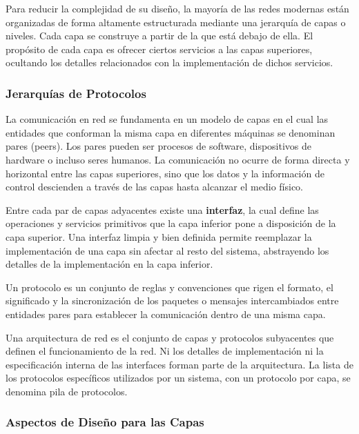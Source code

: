 Para reducir la complejidad de su diseño, la mayoría de las redes modernas están organizadas de forma altamente estructurada mediante una jerarquía de capas o niveles. Cada capa se construye a partir de la que está debajo de ella. El propósito de cada capa es ofrecer ciertos servicios a las capas superiores, ocultando los detalles relacionados con la implementación de dichos servicios.

\subsubsection{Jerarquías de Protocolos}

La comunicación en red se fundamenta en un modelo de capas en el cual las entidades que conforman la misma capa en diferentes máquinas se denominan pares (peers). Los pares pueden ser procesos de software, dispositivos de hardware o incluso seres humanos. La comunicación no ocurre de forma directa y horizontal entre las capas superiores, sino que los datos y la información de control descienden a través de las capas hasta alcanzar el medio físico.

Entre cada par de capas adyacentes existe una \textbf{interfaz}, la cual define las operaciones y servicios primitivos que la capa inferior pone a disposición de la capa superior. Una interfaz limpia y bien definida permite reemplazar la implementación de una capa sin afectar al resto del sistema, abstrayendo los detalles de la implementación en la capa inferior.

\begin{definicion}[Protocolo]
Un protocolo es un conjunto de reglas y convenciones que rigen el formato, el significado y la sincronización de los paquetes o mensajes intercambiados entre entidades pares para establecer la comunicación dentro de una misma capa.
\end{definicion}

\begin{definicion}
Una arquitectura de red es el conjunto de capas y protocolos subyacentes que definen el funcionamiento de la red. Ni los detalles de implementación ni la especificación interna de las interfaces forman parte de la arquitectura. La lista de los protocolos específicos utilizados por un sistema, con un protocolo por capa, se denomina pila de protocolos.
\end{definicion}

\subsubsection{Aspectos de Diseño para las Capas}

